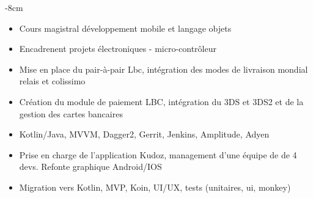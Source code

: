 \documentclass[10pt,a4paper]{altacv}
\begin{document}

\begin{adjustwidth}{}{-8cm}
\makecvheader
\end{adjustwidth}


\begin{itemize}
\item Cours magistral développement mobile et langage objets
\item Encadrenent projets électroniques - micro-contrôleur 
\end{itemize}

\divider

\begin{itemize}
\item Mise en place du pair-à-pair Lbc, intégration des modes de livraison mondial relais et colissimo 
\item Création du module de paiement LBC, intégration du 3DS et 3DS2 et de la gestion des cartes bancaires
\item Kotlin/Java, MVVM, Dagger2, Gerrit, Jenkins, Amplitude, Adyen 
\end{itemize}

\divider

\begin{itemize}
\item Prise en charge de l'application Kudoz, management d’une équipe de  de 4 devs. Refonte graphique Android/IOS
\item Migration vers Kotlin, MVP, Koin, UI/UX, tests (unitaires, ui, monkey)
\end{itemize}
\end{document}
